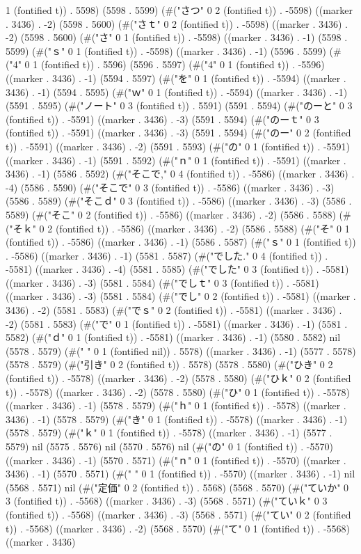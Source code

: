 1 (fontified t)) . 5598) (5598 . 5599) (#("さつ" 0 2 (fontified t)) . -5598) ((marker . 3436) . -2) (5598 . 5600) (#("さｔ" 0 2 (fontified t)) . -5598) ((marker . 3436) . -2) (5598 . 5600) (#("さ" 0 1 (fontified t)) . -5598) ((marker . 3436) . -1) (5598 . 5599) (#("ｓ" 0 1 (fontified t)) . -5598) ((marker . 3436) . -1) (5596 . 5599) (#("4" 0 1 (fontified t)) . 5596) (5596 . 5597) (#("4" 0 1 (fontified t)) . -5596) ((marker . 3436) . -1) (5594 . 5597) (#("を" 0 1 (fontified t)) . -5594) ((marker . 3436) . -1) (5594 . 5595) (#("ｗ" 0 1 (fontified t)) . -5594) ((marker . 3436) . -1) (5591 . 5595) (#("ノート" 0 3 (fontified t)) . 5591) (5591 . 5594) (#("のーと" 0 3 (fontified t)) . -5591) ((marker . 3436) . -3) (5591 . 5594) (#("のーｔ" 0 3 (fontified t)) . -5591) ((marker . 3436) . -3) (5591 . 5594) (#("のー" 0 2 (fontified t)) . -5591) ((marker . 3436) . -2) (5591 . 5593) (#("の" 0 1 (fontified t)) . -5591) ((marker . 3436) . -1) (5591 . 5592) (#("ｎ" 0 1 (fontified t)) . -5591) ((marker . 3436) . -1) (5586 . 5592) (#("そこで," 0 4 (fontified t)) . -5586) ((marker . 3436) . -4) (5586 . 5590) (#("そこで" 0 3 (fontified t)) . -5586) ((marker . 3436) . -3) (5586 . 5589) (#("そこｄ" 0 3 (fontified t)) . -5586) ((marker . 3436) . -3) (5586 . 5589) (#("そこ" 0 2 (fontified t)) . -5586) ((marker . 3436) . -2) (5586 . 5588) (#("そｋ" 0 2 (fontified t)) . -5586) ((marker . 3436) . -2) (5586 . 5588) (#("そ" 0 1 (fontified t)) . -5586) ((marker . 3436) . -1) (5586 . 5587) (#("ｓ" 0 1 (fontified t)) . -5586) ((marker . 3436) . -1) (5581 . 5587) (#("でした." 0 4 (fontified t)) . -5581) ((marker . 3436) . -4) (5581 . 5585) (#("でした" 0 3 (fontified t)) . -5581) ((marker . 3436) . -3) (5581 . 5584) (#("でしｔ" 0 3 (fontified t)) . -5581) ((marker . 3436) . -3) (5581 . 5584) (#("でし" 0 2 (fontified t)) . -5581) ((marker . 3436) . -2) (5581 . 5583) (#("でｓ" 0 2 (fontified t)) . -5581) ((marker . 3436) . -2) (5581 . 5583) (#("で" 0 1 (fontified t)) . -5581) ((marker . 3436) . -1) (5581 . 5582) (#("ｄ" 0 1 (fontified t)) . -5581) ((marker . 3436) . -1) (5580 . 5582) nil (5578 . 5579) (#(" " 0 1 (fontified nil)) . 5578) ((marker . 3436) . -1) (5577 . 5578) (5578 . 5579) (#("引き" 0 2 (fontified t)) . 5578) (5578 . 5580) (#("ひき" 0 2 (fontified t)) . -5578) ((marker . 3436) . -2) (5578 . 5580) (#("ひｋ" 0 2 (fontified t)) . -5578) ((marker . 3436) . -2) (5578 . 5580) (#("ひ" 0 1 (fontified t)) . -5578) ((marker . 3436) . -1) (5578 . 5579) (#("ｈ" 0 1 (fontified t)) . -5578) ((marker . 3436) . -1) (5578 . 5579) (#("き" 0 1 (fontified t)) . -5578) ((marker . 3436) . -1) (5578 . 5579) (#("ｋ" 0 1 (fontified t)) . -5578) ((marker . 3436) . -1) (5577 . 5579) nil (5575 . 5576) nil (5570 . 5576) nil (#("の" 0 1 (fontified t)) . -5570) ((marker . 3436) . -1) (5570 . 5571) (#("ｎ" 0 1 (fontified t)) . -5570) ((marker . 3436) . -1) (5570 . 5571) (#(" " 0 1 (fontified t)) . -5570) ((marker . 3436) . -1) nil (5568 . 5571) nil (#("定価" 0 2 (fontified t)) . 5568) (5568 . 5570) (#("ていか" 0 3 (fontified t)) . -5568) ((marker . 3436) . -3) (5568 . 5571) (#("ていｋ" 0 3 (fontified t)) . -5568) ((marker . 3436) . -3) (5568 . 5571) (#("てい" 0 2 (fontified t)) . -5568) ((marker . 3436) . -2) (5568 . 5570) (#("て" 0 1 (fontified t)) . -5568) ((marker . 3436) 